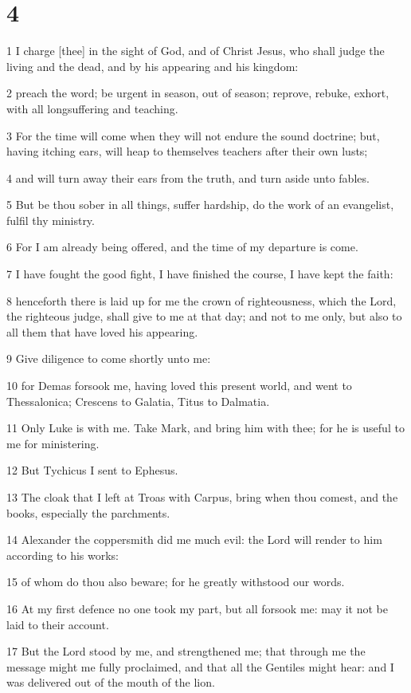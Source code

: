 \chapter{4}

\par 1 I charge [thee] in the sight of God, and of Christ Jesus, who shall judge the living and the dead, and by his appearing and his kingdom:
\par 2 preach the word; be urgent in season, out of season; reprove, rebuke, exhort, with all longsuffering and teaching.
\par 3 For the time will come when they will not endure the sound doctrine; but, having itching ears, will heap to themselves teachers after their own lusts;
\par 4 and will turn away their ears from the truth, and turn aside unto fables.
\par 5 But be thou sober in all things, suffer hardship, do the work of an evangelist, fulfil thy ministry.
\par 6 For I am already being offered, and the time of my departure is come.
\par 7 I have fought the good fight, I have finished the course, I have kept the faith:
\par 8 henceforth there is laid up for me the crown of righteousness, which the Lord, the righteous judge, shall give to me at that day; and not to me only, but also to all them that have loved his appearing.
\par 9 Give diligence to come shortly unto me:
\par 10 for Demas forsook me, having loved this present world, and went to Thessalonica; Crescens to Galatia, Titus to Dalmatia.
\par 11 Only Luke is with me. Take Mark, and bring him with thee; for he is useful to me for ministering.
\par 12 But Tychicus I sent to Ephesus.
\par 13 The cloak that I left at Troas with Carpus, bring when thou comest, and the books, especially the parchments.
\par 14 Alexander the coppersmith did me much evil: the Lord will render to him according to his works:
\par 15 of whom do thou also beware; for he greatly withstood our words.
\par 16 At my first defence no one took my part, but all forsook me: may it not be laid to their account.
\par 17 But the Lord stood by me, and strengthened me; that through me the message might me fully proclaimed, and that all the Gentiles might hear: and I was delivered out of the mouth of the lion.
